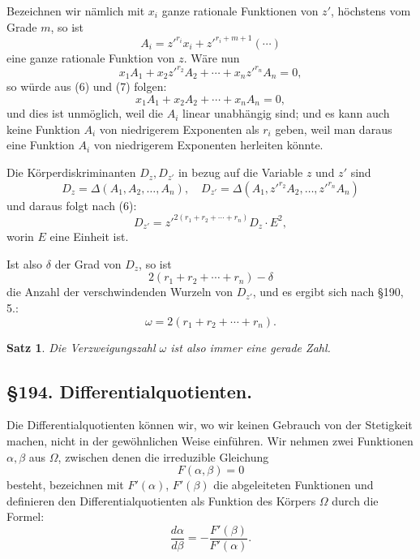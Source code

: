 \documentclass[12pt,a4paper]{article}
\newtheorem*{satz}{Satz}
\begin{document}
Bezeichnen wir nämlich mit $x_i$ ganze rationale Funktionen von $z'$, höchstens vom Grade $m$, so ist
\begin{equation}\label{eq:193-7}
A_i = z'^{r_i} x_i + z'^{r_i+m+1}(\cdots)
\end{equation}
eine ganze rationale Funktion von $z$. Wäre nun
\[
x_1 A_1 + x_2 z'^{r_2} A_2 + \cdots + x_n z'^{r_n} A_n = 0,
\]
so würde aus (6) und (7) folgen:
\[
x_1 A_1 + x_2 A_2 + \cdots + x_n A_n = 0,
\]
und dies ist unmöglich, weil die $A_i$ linear unabhängig sind; und es kann auch keine Funktion $A_i$ von niedrigerem Exponenten als $r_i$ geben, weil man daraus eine Funktion $A_i$ von niedrigerem Exponenten herleiten könnte.

Die Körperdiskriminanten $D_z, D_{z'}$ in bezug auf die Variable $z$ und $z'$ sind
\[
D_z = \Delta(A_1, A_2, \ldots, A_n), \quad D_{z'} = \Delta(A_1, z'^{r_2} A_2, \ldots, z'^{r_n} A_n)
\]
und daraus folgt nach (6):
\begin{equation}\label{eq:193-8}
D_{z'} = z'^{2(r_1 + r_2 + \cdots + r_n)} D_z \cdot E^2,
\end{equation}
worin $E$ eine Einheit ist.

Ist also $\delta$ der Grad von $D_z$, so ist
\[
2(r_1 + r_2 + \cdots + r_n) - \delta
\]
die Anzahl der verschwindenden Wurzeln von $D_{z'}$, und es ergibt sich nach \S 190, 5.:
\begin{equation}\label{eq:193-9}
\omega = 2(r_1 + r_2 + \cdots + r_n).
\end{equation}

\begin{satz}
Die Verzweigungszahl $\omega$ ist also immer eine gerade Zahl.
\end{satz}

\subsection*{\S 194. Differentialquotienten.}

Die Differentialquotienten können wir, wo wir keinen Gebrauch von der Stetigkeit machen, nicht in der gewöhnlichen Weise einführen. Wir nehmen zwei Funktionen $\alpha, \beta$ aus $\Omega$, zwischen denen die irreduzible Gleichung
\begin{equation}\label{eq:194-1}
F(\alpha, \beta) = 0
\end{equation}
besteht, bezeichnen mit $F'(\alpha)$, $F'(\beta)$ die abgeleiteten Funktionen und definieren den Differentialquotienten als Funktion des Körpers $\Omega$ durch die Formel:
\begin{equation}\label{eq:194-2}
\frac{d\alpha}{d\beta} = -\frac{F'(\beta)}{F'(\alpha)}.
\end{equation}
\end{document}
